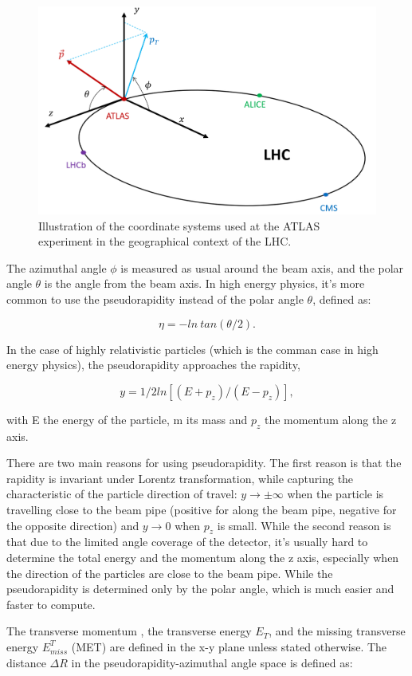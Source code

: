 	\begin{figure}[bht]
		\begin{centering}	
		\includegraphics[width=.55\textwidth]{Detector_plots/ATLAS coordinate system.png}
		\caption{Illustration of the coordinate systems 
		used at the ATLAS experiment in the geographical context of the LHC.
			}
		\label{fig:ATLAS_coordinate_system}
		\end{centering}
	\end{figure}

	The azimuthal angle $\phi$ 
	is measured as usual around the beam axis, and 
	the polar angle $\theta$ is the angle from the beam axis.  
	In high energy physics, it's more common to use the 
	pseudorapidity instead of the
	polar angle $\theta$, defined as:

	\[ \eta = -ln\ tan(\theta/2). \]

	In the case of highly relativistic particles
	(which is the comman case in high energy physics), 
	the pseudorapidity approaches the rapidity, 

	\[ y=1/2ln[(E+p_z)/(E-p_z)], \]

	with E the energy of the particle, m its mass 
	and $p_z$ the momentum along the z axis.

	There are two main reasons for using pseudorapidity.
	The first reason is that the rapidity is invariant
	under Lorentz transformation, while capturing 
	the characteristic of the particle direction of travel:
	$y \rightarrow \pm \infty $ when the particle is  
	travelling close to the beam pipe (positive for along the
	beam pipe, negative for the opposite direction) and
	$y \rightarrow 0$ when $p_z$ is small.
	While the second reason is that due to the limited
	angle coverage of the detector, it's usually hard
	to determine the total energy and the momentum 
	along the z axis, especially when the direction of 
	the particles are close to the beam pipe. 
	While the pseudorapidity is determined only by
	the polar angle, which is much easier and faster 
	to compute. 

	The transverse momentum \pt, the transverse energy
	$E_T$, and the missing transverse energy $E_{miss}^T$ (MET) 
	are defined in the x-y plane unless stated otherwise.  
	The distance $\Delta R$ in the pseudorapidity-azimuthal angle 
	space is defined as:

